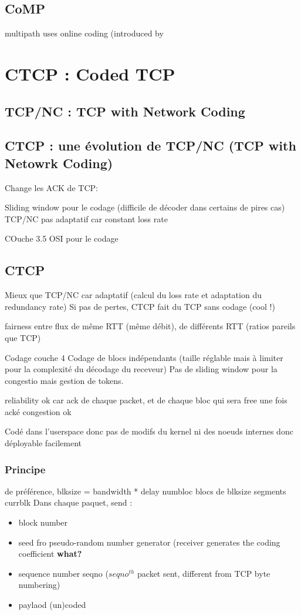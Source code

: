 \documentclass[frenchb]{article}
\begin{document}
\subsection{CoMP}
multipath
uses online coding (introduced by

\section{CTCP : Coded TCP}


\subsection{TCP/NC : TCP with Network Coding}
\label{tcpnc}

\subsection{CTCP : une évolution de TCP/NC (TCP with Netowrk Coding)}
Change les ACK de TCP:

Sliding window pour le codage (difficile de décoder dans certains de pires cas)
TCP/NC pas adaptatif car constant loss rate

COuche 3.5 OSI pour le codage

\subsection{CTCP}
Mieux que TCP/NC car adaptatif (calcul du loss rate et adaptation du redundancy rate)
Si pas de pertes, CTCP fait du TCP sans codage (cool !)

fairness entre flux de même RTT (même débit), de différents RTT (ratios pareils que TCP)

Codage couche 4
Codage de blocs indépendants (taille réglable mais à limiter pour la complexité du décodage du receveur)
Pas de sliding window pour la congestio mais gestion de tokens.


reliability ok car ack de chaque packet, et de chaque bloc qui sera free une fois acké
congestion ok

Codé dans l'userspace donc pas de modifs du kernel ni des noeuds internes donc déployable facilement


\subsubsection{Principe}
de préférence, blksize = bandwidth * delay
\textsf{numbloc} blocs de \textsf{blksize} segments
\textsf{currblk}
Dans chaque paquet, send :
\begin{itemize}
\item block number
\item  seed fro pseudo-random number generator (receiver generates the coding coefficient \textbf{what?}
\item sequence number \textsf{seqno} ($seqno^{th}$ packet sent, different from TCP byte numbering)
\item paylaod (un)coded
\end{itemize}
\end{document}
